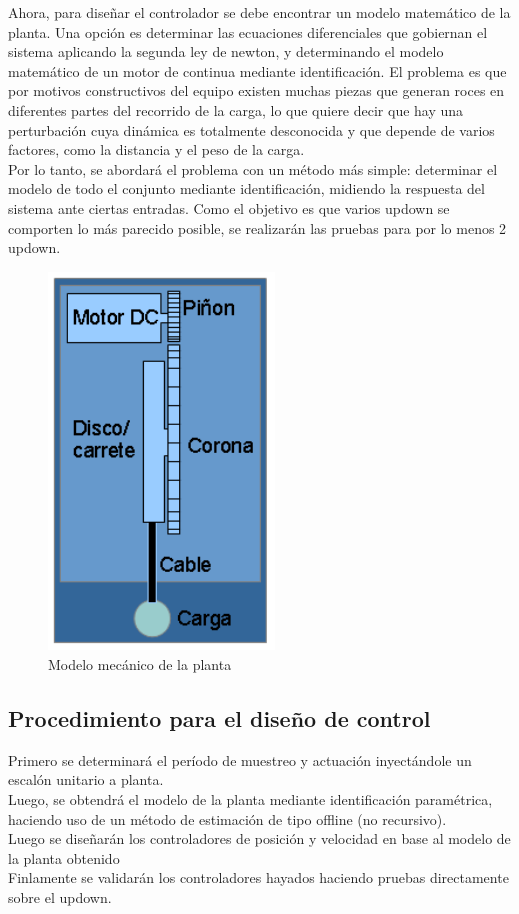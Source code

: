 Ahora, para diseñar el controlador se debe encontrar un modelo matemático de la planta. Una opción es determinar las ecuaciones diferenciales que gobiernan el sistema aplicando la segunda ley de newton, y determinando el modelo matemático de un motor de continua mediante identificación. El problema es que por motivos constructivos del equipo existen muchas piezas que generan roces en diferentes partes del recorrido de la carga, lo que quiere decir que hay una perturbación cuya dinámica es totalmente desconocida y que depende de varios factores, como la distancia y el peso de la carga.\\
Por lo tanto, se abordará el problema con un método más simple: determinar el modelo de todo el conjunto mediante identificación, midiendo la respuesta del sistema ante ciertas entradas. Como el objetivo es que varios updown se comporten lo más parecido posible, se realizarán las pruebas para por lo menos 2 updown. 

\begin{figure}[!ht]
	\centering
	\includegraphics[width=6cm,scale=1]{resources/2_2-modeloMecPlanta.png}
	\caption{Modelo mecánico de la planta}
	\label{fig:\thefigure}
\end{figure}


\subsection{Procedimiento para el diseño de control}
Primero se determinará el período de muestreo y actuación inyectándole un escalón unitario a planta.\\
Luego, se obtendrá el modelo de la planta mediante identificación paramétrica, haciendo uso de un método de estimación de tipo offline (no recursivo).\\
Luego se diseñarán los controladores de posición y velocidad en base al modelo de la planta obtenido\\
Finlamente se validarán los controladores hayados haciendo pruebas directamente sobre el updown.

